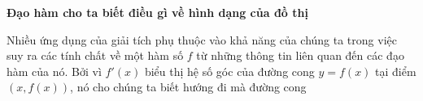 \vspace{22pt}

\noindent
\begin{minipage}[t]{0.22\textwidth}
  \vspace{0pt}
\end{minipage}%
\hfill
\begin{minipage}[t]{0.75\textwidth}
  \vspace{0pt}
  {\fontsize{14.5}{18}\selectfont\sffamily\bfseries Đạo hàm cho ta biết điều gì về hình dạng của đồ thị}\par
  \vspace{8pt}
  \normalsize
  Nhiều ứng dụng của giải tích phụ thuộc vào khả năng của chúng ta trong việc suy ra các tính chất về một hàm số $f$ từ những thông tin liên quan đến các đạo hàm của nó. Bởi vì $f'(x)$ biểu thị hệ số góc của đường cong $y = f(x)$ tại điểm $(x, f(x))$, nó cho chúng ta biết hướng đi mà đường cong
\end{minipage}
